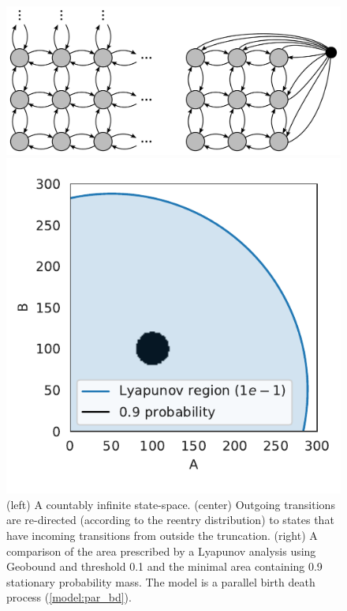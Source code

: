 \begin{figure}[t]
    \centering
    \begin{minipage}{0.6\textwidth}
    \includegraphics[width=\textwidth]{gfx/state_space_all.pdf}
    \end{minipage}
    \begin{minipage}{0.35\textwidth}
    \includegraphics[width=\textwidth]{gfx/parbd_lya_v_truth.pdf}
    \end{minipage}
	\caption[\ac{FSP} for stationary distribution approximation]{(left) A countably infinite state-space. (center) Outgoing transitions are re-directed (according to the reentry distribution) to states that have incoming transitions from outside the truncation. (right) A comparison of the area prescribed by a Lyapunov analysis using Geobound and threshold 0.1 and the minimal area containing 0.9 stationary probability mass. The model is a parallel birth death process (\autoref{model:par_bd}).}
    \label{fig:truncation}
\end{figure}

